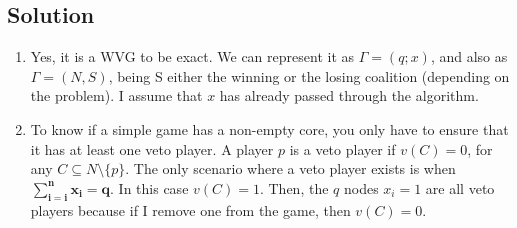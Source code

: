 \documentclass[a4paper, 11pt]{article}
\begin{document}
\subsection*{Solution}
\begin{enumerate}[label=(\alph*)]
    \item Yes, it is a WVG to be exact. We can represent it as $\Gamma = (q; x)$, and also as $\Gamma = (N,S)$, being S either the winning or the losing coalition (depending on the problem). I assume that $x$ has already passed through the algorithm.
    \item To know if a simple game has a non-empty core, you only have to ensure that it has at least one veto player. A player $p$ is a veto player if $v(C) = 0$, for any $C \subseteq N \setminus \{p\}$. The only scenario where a veto player exists is when $\mathbf{\sum_{i=i}^n x_i = q}$. In this case $v(C) = 1$. Then, the $q$ nodes $x_i = 1$ are all veto players because if I remove one from the game, then $v(C) = 0$.
\end{enumerate}
\end{document}
